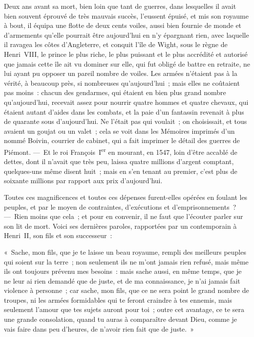 \documentclass[french,twoside]{book} %
\begin{document}
Deux ans avant sa mort, bien loin que tant de guerres, dans lesquelles il avait bien souvent éprouvé de très mauvais succès, l’eussent épuisé, et mis son royaume à bout, il équipa une flotte de deux cents voiles, aussi bien fournie de monde et d’armements qu’elle pourrait être aujourd’hui en n’y épargnant rien, avec laquelle il ravagea les côtes d’Angleterre, et conquit l’île de Wight, sous le règne de Henri VIII, le prince le plus riche, le plus puissant et le plus accrédité et autorisé que jamais cette île ait vu dominer sur elle, qui fut obligé de battre en retraite, ne lui ayant pu opposer un pareil nombre de voiles. Les armées n’étaient pas à la vérité, à beaucoup près, si nombreuses qu’aujourd’hui ; mais elles ne coûtaient pas moins : chacun des gendarmes, qui étaient en bien plus grand nombre qu’aujourd’hui, recevait assez pour nourrir quatre hommes et quatre chevaux, qui étaient autant d’aides dans les combats, et la paie d’un fantassin revenait à plus de quarante sous d’aujourd’hui. Ne l’était pas qui voulait ; on choisissait, et tous avaient un goujat ou un valet ; cela se voit dans les Mémoires imprimés d’un nommé Boivin, courrier de cabinet, qui a fait imprimer le détail des guerres de Piémont. — Et le roi François I\textsuperscript{er} en mourant, en 1547, loin d’être accablé de dettes, dont il n’avait que très peu, laissa quatre millions d’argent comptant, quelques-uns même disent huit ; mais en s’en tenant au premier, c’est plus de soixante millions par rapport aux prix d’aujourd’hui.\par
Toutes ces magnificences et toutes ces dépenses furent-elles opérées en foulant les peuples, et par le moyen de contraintes, d’exécutions et d’emprisonnements ? — Rien moins que cela ; et pour en convenir, il ne faut que l’écouter parler sur son lit de mort. Voici ses dernières paroles, rapportées par un contemporain à Henri II, son fils et son successeur :\par
« Sache, mon fils, que je te laisse un beau royaume, rempli des meilleurs peuples qui soient sur la terre ; non seulement ils ne m’ont jamais rien refusé, mais même ils ont toujours prévenu mes besoins : mais sache aussi, en même temps, que je ne leur ai rien demandé que de juste, et de ma connaissance, je n’ai jamais fait violence à personne ; car sache, mon fils, que ce ne sera point le grand nombre de troupes, ni les armées formidables qui te feront craindre à tes ennemis, mais seulement l’amour que tes sujets auront pour toi ; outre cet avantage, ce te sera une grande consolation, quand tu auras à comparaître devant Dieu, comme je vais faire dans peu d’heures, de n’avoir rien fait que de juste. »\par
\end{document}
